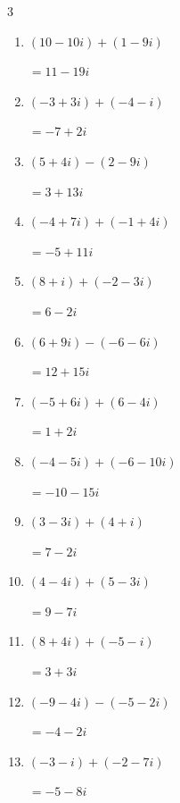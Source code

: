 \begin{multicols}{3}
\begin{enumerate}
  \item $\displaystyle (10-10i) + (1-9i)$

        $\displaystyle =11-19i$

  \item $\displaystyle (-3+3i) + (-4-i)$

        $\displaystyle =-7+2i$

  \item $\displaystyle (5+4i) - (2-9i)$

        $\displaystyle =3+13i$

  \item $\displaystyle (-4+7i) + (-1+4i)$

        $\displaystyle =-5+11i$

  \item $\displaystyle (8+i) + (-2-3i)$

        $\displaystyle =6-2i$

  \item $\displaystyle (6+9i) - (-6-6i)$

        $\displaystyle =12+15i$

  \item $\displaystyle (-5+6i) + (6-4i)$

        $\displaystyle =1+2i$

  \item $\displaystyle (-4-5i) + (-6-10i)$

        $\displaystyle =-10-15i$

  \item $\displaystyle (3-3i) + (4+i)$

        $\displaystyle =7-2i$

  \item $\displaystyle (4-4i) + (5-3i)$

        $\displaystyle =9-7i$

\columnbreak %

\resetques

  \item $\displaystyle (8+4i) + (-5-i)$

        $\displaystyle =3+3i$

  \item $\displaystyle (-9-4i) - (-5-2i)$

        $\displaystyle =-4-2i$

  \item $\displaystyle (-3-i) + (-2-7i)$

        $\displaystyle =-5-8i$


\end{enumerate}
\end{multicols}
